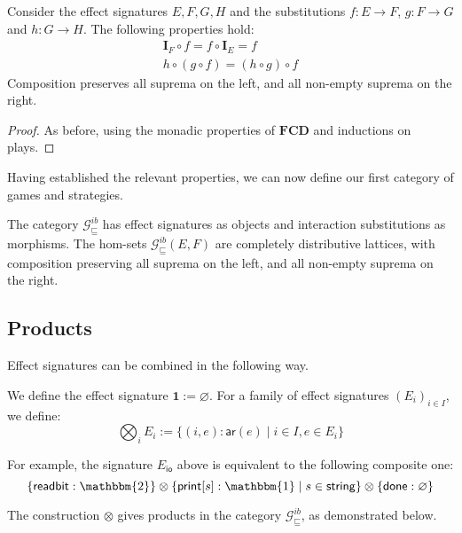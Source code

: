 \documentclass[sigplan,10pt,review,anonymous]{acmart}
\newcommand{\gcat}{\mathcal{G}_{\sqsubseteq}}
\newcommand{\kw}[1]{\ensuremath{ \mathsf{#1} }}
\begin{document}
\begin{lemma}
Consider the effect signatures $E, F, G, H$ and
the substitutions
$f : E \rightarrow F$,
$g : F \rightarrow G$ and
$h : G \rightarrow H$.
The following properties hold:
\begin{gather*}
  \mathbf{I}_F \circ f = f \circ \mathbf{I}_E = f \\
  h \circ (g \circ f) = (h \circ g) \circ f
\end{gather*}
Composition preserves all suprema on the left,
and all non-empty suprema on the right.
\begin{proof}
As before,
using the monadic properties of $\mathbf{FCD}$
and inductions on plays.
\end{proof}
\end{lemma}

Having established the relevant properties,
we can now define our first category of games and strategies.

\begin{definition}
The category $\gcat^{ib}$ has effect signatures as objects
and interaction substitutions as morphisms.
The hom-sets $\gcat^{ib}(E, F)$
are completely distributive lattices,
with composition preserving all suprema on the left,
and all non-empty suprema on the right.
\end{definition}


\subsection{Products} %

Effect signatures can be combined in the following way.

\begin{definition}
We define the effect signature
$\mathbf{1} := \varnothing$.
For a family of effect signatures $(E_i)_{i \in I}$,
we define:
\[
  \bigotimes_i E_i := \{ (i, e) : \kw{ar}(e) \mid i \in I, e \in E_i \}
\]
\end{definition}

For example,
the signature $E_\kw{io}$ above is equivalent
to the following composite one:
\[
    \{ \kw{readbit} : \mathbbm{2} \} \otimes
    \{ \kw{print}[s] : \mathbbm{1} \mid s \in \kw{string} \} \otimes
    \{ \kw{done} : \varnothing \}
\]

The construction $\otimes$ gives products in the category $\gcat^{ib}$,
as demonstrated below.
\end{document}

